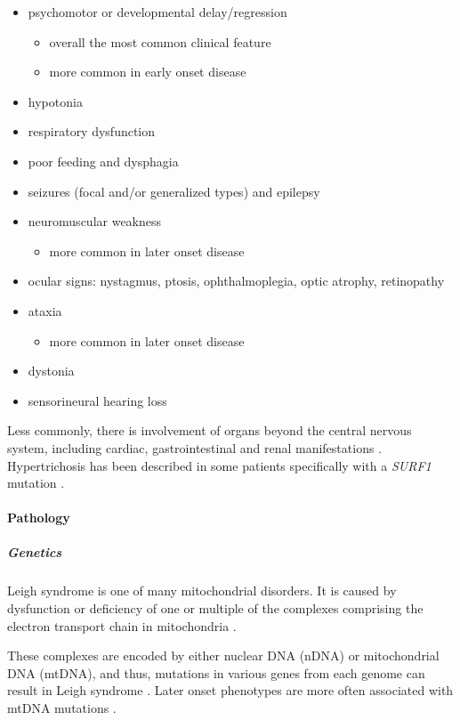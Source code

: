 \begin{itemize}
	\item
	psychomotor or developmental delay/regression
	
	\begin{itemize}
		\item
		overall the most common clinical feature
		\item
		more common in early onset disease
	\end{itemize}
	\item
	hypotonia
	\item
	respiratory dysfunction
	\item
	poor feeding and dysphagia
	\item
	seizures (focal and/or generalized types) and epilepsy
	\item
	neuromuscular weakness
	
	\begin{itemize}
		\item
		more common in later onset disease
	\end{itemize}
	\item
	ocular signs: nystagmus, ptosis, ophthalmoplegia, optic atrophy, retinopathy
	\item
	ataxia
	
	\begin{itemize}
		\item
		more common in later onset disease
	\end{itemize}
	\item
	dystonia
	\item
	sensorineural hearing loss
\end{itemize}

Less commonly, there is involvement of organs beyond the central nervous system, including cardiac, gastrointestinal and renal manifestations . Hypertrichosis has been described in some patients specifically with a \emph{SURF1} mutation .

\paragraph{Pathology}

\subparagraph{Genetics}

Leigh syndrome is one of many mitochondrial disorders. It is caused by dysfunction or deficiency of one or multiple of the complexes comprising the electron transport chain in mitochondria .

These complexes are encoded by either nuclear DNA (nDNA) or mitochondrial DNA (mtDNA), and thus, mutations in various genes from each genome can result in Leigh syndrome . Later onset phenotypes are more often associated with mtDNA mutations .

